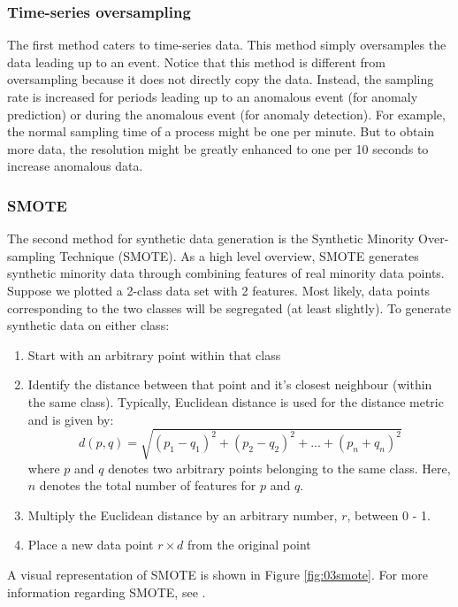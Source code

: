\subsubsection{Time-series oversampling}
The first method caters to time-series data. This method simply oversamples the data leading up to an event.  Notice that this method is different from oversampling because it does not directly copy the data.  Instead, the sampling rate is increased for periods leading up to an anomalous event (for anomaly prediction) or during the anomalous event (for anomaly detection).  For example, the normal sampling time of a process might be one per minute. But to obtain more data, the resolution might be greatly enhanced to one per 10 seconds to increase anomalous data.

\subsubsection{SMOTE}
The second method for synthetic data generation is the Synthetic Minority Over-sampling Technique (SMOTE). As a high level overview, SMOTE generates synthetic minority data through combining features of real minority data points. Suppose we plotted a 2-class data set with 2 features.  Most likely, data points corresponding to the two classes will be segregated (at least slightly).  To generate synthetic data on either class: 
\begin{enumerate}
    \item Start with an arbitrary point within that class
    \item Identify the distance between that point and it's closest neighbour (within the same class).  Typically, Euclidean distance is used for the distance metric and is given by:
    \begin{equation}
        d(p, q) = \sqrt{(p_1 - q_1)^2 + (p_2 - q_2)^2 + ... + (p_n + q_n)^2}
    \end{equation}
    where $p$ and $q$ denotes two arbitrary points belonging to the same class.  Here, $n$ denotes the total number of features for $p$ and $q$.
    \item Multiply the Euclidean distance by an arbitrary number, $r$, between 0 - 1.
    \item Place a new data point $r \times d$ from the original point
\end{enumerate}

A visual representation of SMOTE is shown in Figure \ref{fig:03smote}. For more information regarding SMOTE, see \cite{smote}.

